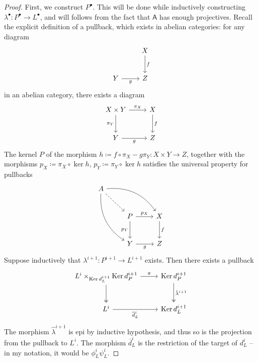 \begin{proof}
	First, we construct $P^{\bullet} $. This will be done while inductively constructing $\lambda ^{\bullet} : P^{\bullet}  \to L^{\bullet} $, and will follows from the fact that $\mathsf{A} $ has enough projectives. Recall the explicit definition of a pullback, which exists in abelian categories: for any diagram
	\[\begin{tikzcd}[row sep = 2.5em, column sep = 2.5em]
		&X\ar[d, "f"]\\
		Y\ar[r, "g"']&Z
	\end{tikzcd}\]
	in an abelian category, there exists a diagram
	\[\begin{tikzcd}[row sep = 2.5em, column sep = 2.5em]
		X\times Y\ar[r, "\pi _X"]\ar[d, "\pi _Y"']&X\ar[d, "f"]\\
		Y\ar[r, "g"']&Z
	\end{tikzcd}\]
	The kernel $P$ of the morphism $h\coloneqq f\circ \pi _X-g\pi _Y : X\times Y \to Z$, together with the morphisms $p_X\coloneqq \pi _X\circ  \ker h$, $p_Y\coloneqq \pi _Y \circ \ker h$ satisfies the universal property for pullbacks
	\[\begin{tikzcd}[row sep = 2.5em, column sep = 2.5em]
		A\ar[dr, dashed]\ar[drr, bend left]\ar[ddr, bend right]\\
		&P\ar[r, "p_X"]\ar[d, "p_Y"']&X\ar[d, "f"]\\
		&Y\ar[r, "g"']&Z
	\end{tikzcd}\]
	Suppose inductively that $\lambda ^{i+1} : P^{i+1}  \to L^{i+1} $ exists. Then there exists a pullback
	\[\begin{tikzcd}[row sep = 2.5em, column sep = 2.5em]
		L^i\times_{\Ker d_L^{i+1} } \Ker d_P^{i+1} \ar[r, "\pi "]\ar[d, two heads]&\Ker d_P^{i+1} \ar[d, " \hat{\lambda }^{i+1} ", two heads]\\
		L^i\ar[r, " \overline{d}_L^{i} "']&\Ker d_L^{i+1} 
	\end{tikzcd}\]
	The morphism $\hat{\lambda }^{i+1} $ is epi by inductive hypothesis, and thus so is the projection from the pullback to $L^i$. The morphism $\overline{d} _L^i$ is the restriction of the target of $d_L^i$ -- in my notation, it would be $\phi_L^i\psi_L^i$.


\end{proof}
